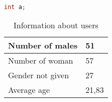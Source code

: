 \begin{lstlisting}[language=C++, tabsize=2, caption={Manager}]
int a;
\end{lstlisting}



\begin{table}[ht]
    \centering
    \begin{tabular}{ | l | l | }
    \hline
    Number of males & 51 \\ \hline
    Number of woman & 57 \\ \hline
    Gender not given & 27 \\ \hline
    Average age & 21,83 \\ \hline
    \end{tabular}
    \caption{Information about users}
    \label{tab:table1}
\end{table}
